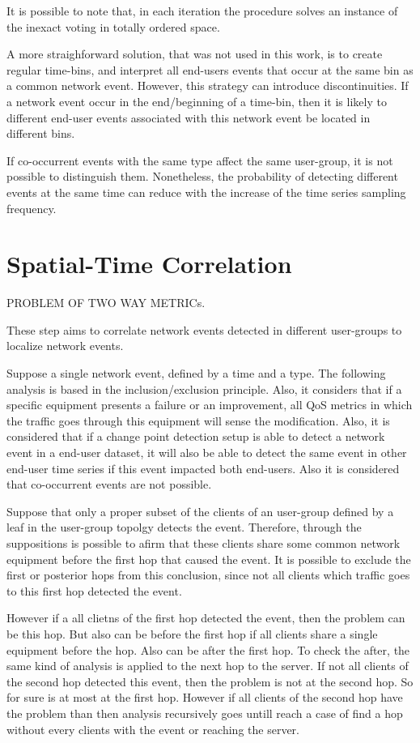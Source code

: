 It is possible to note that, in each iteration the procedure solves an instance
of the inexact voting in totally ordered space.

A more straighforward solution, that was not used in this work, is to create
regular time-bins, and interpret all end-users events that occur at the same
bin as a common network event.
However, this strategy can introduce
discontinuities. If a network event occur in the end/beginning of a time-bin,
then it is likely to different end-user events associated with this
network event be located in different bins.

If co-occurrent events with the same type affect the same user-group,
it is not possible to distinguish them. Nonetheless, the probability of
detecting different events at the same time can reduce with the increase
of the time series sampling frequency.

\section{Spatial-Time Correlation}
\label{sec:spatial_time_correlation}

PROBLEM OF TWO WAY METRICs.

These step aims to correlate network events detected in different user-groups
to localize network events.

Suppose a single network event, defined by a time and a type. The following
analysis is based in the inclusion/exclusion principle. Also, it considers that
if a specific equipment presents a failure or an improvement, all QoS metrics
in which the traffic goes through this equipment will sense the modification.
Also, it is considered that if a change point detection setup is able to
detect a network event in a end-user dataset, it will also be able to detect
the same event in other end-user time series if this event impacted both
end-users. Also it is considered that co-occurrent events are not possible.

Suppose that only a proper subset of the clients of an user-group defined by a
leaf in the user-group topolgy detects the event. Therefore, through the
suppositions is possible to afirm that these clients share some common network
equipment before the first hop that caused the event. It is possible to exclude
the first or posterior hops from this conclusion, since not all clients which
traffic goes to this first hop detected the event.

However if a all clietns of the first hop detected the event, then the  problem
can be this hop. But also can be before the first hop if all clients share a
single equipment before the hop. Also can be after the first hop. To check the
after, the same kind of analysis is applied to the next hop to the server. If
not all clients of the second hop detected this event, then the problem is not
at the second hop. So for sure is at most at the first hop. However if all
clients of the second hop have the problem than then analysis recursively goes
untill reach a case of find a hop without every clients with the event or
reaching the server.

